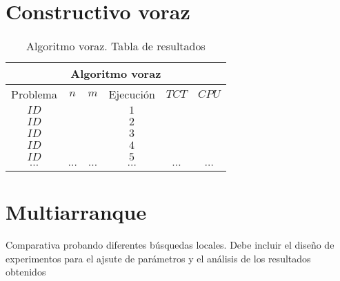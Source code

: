 \section{Constructivo voraz}



   \begin{table}[h]
   {\small
   \begin{center}
   \begin{tabular}{cccccc}
      \multicolumn{6}{c}{Algoritmo voraz} \\
      \hline
      Problema & $n$ & $m$ &  Ejecuci\'on & $TCT$ & $CPU$ \\
      \hline
      $ID$   &     &    &     $1$      &       &       \\
      $ID$   &     &    &     $2$      &       &       \\
      $ID$   &     &    &     $3$      &       &       \\
      $ID$   &     &    &     $4$      &       &       \\
      $ID$   &     &    &     $5$      &       &       \\        
      $\cdots$ &$\cdots$ & $\cdots$ &$\cdots$ &$\cdots$ &$\cdots$ \\
      \hline
   \end{tabular}
   \end{center}
   }
   \caption{Algoritmo voraz. Tabla de resultados}
   \end{table}


\section{Multiarranque}

Comparativa probando diferentes búsquedas locales.
Debe incluir el diseño de experimentos para el ajsute de parámetros y el análisis de los resultados obtenidos

